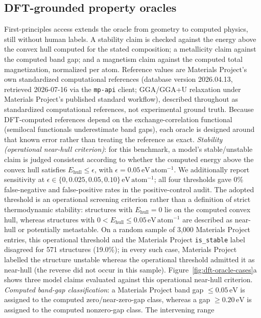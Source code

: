 \documentclass[pdflatex,sn-nature]{sn-jnl}
\begin{document}
\subsection*{DFT-grounded property oracles}
First-principles access extends the oracle from geometry to computed physics, still
without human labels. A stability claim is checked against the energy above the
convex hull computed for the stated composition; a metallicity claim against the
computed band gap; and a magnetism claim against the computed total magnetization,
normalized per atom. Reference values are Materials Project's own standardized
computational references (database version 2026.04.13, retrieved 2026-07-16 via the
\texttt{mp-api} client; GGA/GGA+U relaxation under Materials Project's published standard workflow), described throughout as standardized computational references, not experimental ground truth. Because DFT-computed references depend on the exchange-correlation functional (semilocal functionals underestimate band gaps), each oracle is designed around that known error rather than
treating the reference as exact. \emph{Stability (operational near-hull criterion)}: for this benchmark, a model's stable/unstable claim is judged consistent according to whether the computed energy above the convex hull satisfies
$E_{\mathrm{hull}}\leq\epsilon$, with $\epsilon=0.05\,\mathrm{eV\,atom^{-1}}$. We additionally report sensitivity at $\epsilon\in\{0,0.025,0.05,0.10\}\,\mathrm{eV\,atom^{-1}}$; all four thresholds gave 0\% false-negative and false-positive rates in the positive-control audit. The adopted threshold is an operational screening criterion rather than a definition of strict thermodynamic stability: structures with $E_{\mathrm{hull}}=0$ lie on the computed convex hull, whereas structures with $0<E_{\mathrm{hull}}\leq0.05\,\mathrm{eV\,atom^{-1}}$ are described as near-hull or potentially metastable. On a random sample of 3,000 Materials Project entries, this operational threshold and the Materials Project \texttt{is\_stable} label disagreed for 571 structures (19.0\%); in every such case, Materials Project labelled the structure unstable whereas the operational threshold admitted it as near-hull (the reverse did not occur in this sample).
Figure~\ref{fig:dft-oracle-cases}a shows three model claims evaluated against this operational near-hull criterion. 
\emph{Computed band-gap classification}: a Materials Project band gap
$\leq0.05\,\mathrm{eV}$ is assigned to the computed zero/near-zero-gap
class, whereas a gap $\geq0.20\,\mathrm{eV}$ is assigned to the computed
nonzero-gap class. The intervening range
\end{document}
